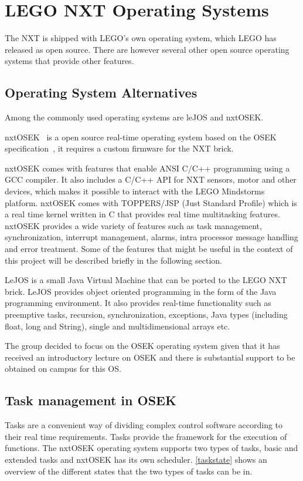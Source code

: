 \section{LEGO NXT Operating Systems}
The NXT is shipped with LEGO's own operating system, which LEGO has released as open source. There are however several other open source operating systems that provide other features. 

\subsection{Operating System Alternatives} %
\label{sub:opertating_system_alternatives}
Among the commonly used operating systems are leJOS and nxtOSEK.

nxtOSEK~\cite{osek_os} is a open source real-time operating system based on the OSEK specification~\cite{osek_spec}, it requires a custom firmware for the NXT brick.

nxtOSEK comes with features that enable ANSI C/C++ programming using a GCC compiler. It also includes a C/C++ API for NXT sensors, motor and other devices, which makes it possible to interact with the LEGO Mindstorms platform. nxtOSEK comes with TOPPERS/JSP (Just Standard Profile) which is a real time kernel written in C that provides real time multitasking features. nxtOSEK provides a wide variety of features such as task management, synchronization, interrupt management, alarms, intra processor message handling and error treatment. Some of the features that might be useful in the context of this project will be described briefly in the following section. 

LeJOS is a small Java Virtual Machine that can be ported to the LEGO NXT brick\cite{lejos}. LeJOS provides object oriented programming in the form of the Java programming environment. It also provides real-time functionality such as preemptive tasks, recursion, synchronization, exceptions, Java types (including float, long and String), single and multidimensional arrays etc. 

The group decided to focus on the OSEK operating system given that it has received an introductory lecture on OSEK and there is substantial support to be obtained on campus for this OS.

\subsection{Task management in OSEK} %
\label{sub:task_management_in_osek}
Tasks are a convenient way of dividing complex control software according to their real time requirements. Tasks provide the framework for the execution of functions. 
The nxtOSEK operating system supports two types of tasks, basic and extended tasks and nxtOSEK has its own scheduler. \autoref{taskstate} shows an overview of the different states that the two types of tasks can be in.

